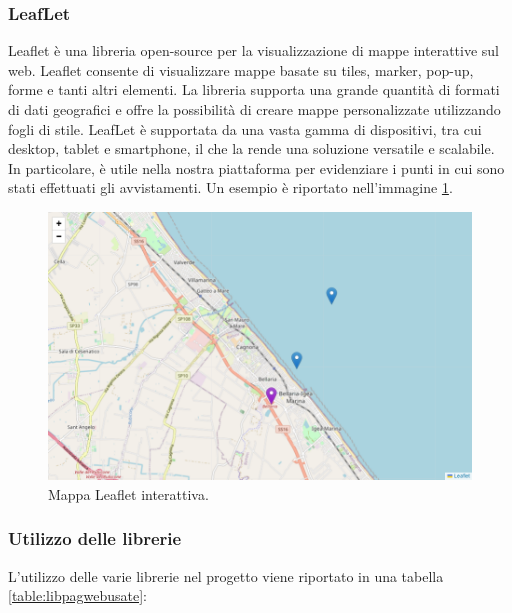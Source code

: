 \documentclass[a4paper,final,12pt]{report}
\begin{document}
\subsubsection{LeafLet}
Leaflet \cite{Leaflet} è una libreria open-source per la visualizzazione di mappe interattive sul web. Leaflet consente di visualizzare mappe basate su tiles, marker, pop-up, forme e tanti altri elementi. La libreria supporta una grande quantità di formati di dati geografici e offre la possibilità di creare mappe personalizzate utilizzando fogli di stile. LeafLet è supportata da una vasta gamma di dispositivi, tra cui desktop, tablet e smartphone, il che la rende una soluzione versatile e scalabile. In particolare, è utile nella nostra piattaforma per evidenziare i punti in cui sono stati effettuati gli avvistamenti. Un esempio è riportato nell'immagine \ref{figura:leafletimgesempio}.
\begin{figure}[hbtp]
\centering
\includegraphics[scale=0.65]{img_concettuale/lflet.png}
\caption{Mappa Leaflet interattiva.}
\label{figura:leafletimgesempio}
\end{figure} 

\subsubsection{Utilizzo delle librerie}
L'utilizzo delle varie librerie nel progetto viene riportato in una tabella \ref{table:libpagwebusate}:
\begin{table}[hbtp]
\centering
{}
\caption{Tabella delle librerie utilizzate nella pagina web.}
\label{table:libpagwebusate}
\end{table}
\end{document}
